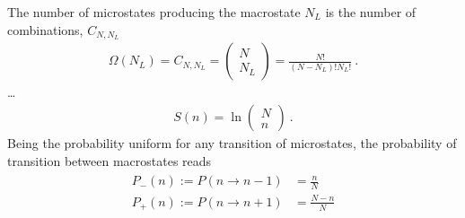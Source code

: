 \documentclass[letterpaper,10pt,english]{jupyterBook}
\begin{document}
\sphinxAtStartPar
{} The number of microstates producing the macrostate \(N_L\) is the number of combinations, \(C_{N, N_L}\)
\begin{equation*}
\begin{split}\Omega(N_L) = C_{N, N_L} = \left( \begin{matrix} N \\ N_L \end{matrix} \right) = \frac{N!}{(N-N_L)! N_L!} \ .\end{split}
\end{equation*}
\sphinxAtStartPar
{} …
\begin{equation*}
\begin{split}S(n) = \ln \left( \begin{matrix} N \\ n \end{matrix} \right) \ .\end{split}
\end{equation*}
\sphinxAtStartPar
{} Being the probability uniform for any transition of microstates, the probability of transition between macrostates reads
\begin{equation}\label{equation:ch/statistical-mechanics/entropy:eq:entropy:box:trans-prob}
\begin{split}\begin{aligned}
  P_{-}(n) := P(n \rightarrow n-1) & = \frac{n}{N} \\
  P_{+}(n) := P(n \rightarrow n+1) & = \frac{N-n}{N} \\
\end{aligned}\end{split}
\end{equation}
\sphinxAtStartPar
{}
\end{document}

